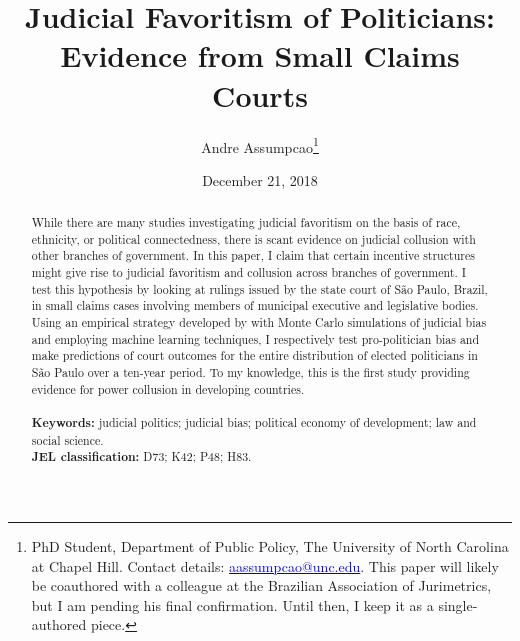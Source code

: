 \documentclass[11pt]{article}
\begin{document}
\begin{titlepage}
\title{Judicial Favoritism of Politicians: Evidence from Small Claims Courts}
\author{Andre Assumpcao\thanks{PhD Student, Department of Public Policy, The University of North Carolina at Chapel Hill. Contact details: \href{mailto:aassumpcao@unc.edu}{\textcolor{blue}{aassumpcao@unc.edu}}. This paper will likely be coauthored with a colleague at the Brazilian Association of Jurimetrics, but I am pending his final confirmation. Until then, I keep it as a single-authored piece.}}
\date{December 21, 2018}

\maketitle

\begin{abstract}
\noindent While there are many studies investigating judicial favoritism on the basis of race, ethnicity, or political connectedness, there is scant evidence on judicial collusion with other branches of government. In this paper, I claim that certain incentive structures might give rise to judicial favoritism and collusion across branches of government. I test this hypothesis by looking at rulings issued by the state court of São Paulo, Brazil, in small claims cases involving members of municipal executive and legislative bodies. Using an empirical strategy developed by \citet{AbramsJudgesVaryTheir2012} with Monte Carlo simulations of judicial bias and employing machine learning techniques, I respectively test pro-politician bias and make predictions of court outcomes for the entire distribution of elected politicians in São Paulo over a ten-year period. To my knowledge, this is the first study providing evidence for power collusion in developing countries. \\
\vspace{0in} \\
\noindent\textbf{Keywords:} judicial politics; judicial bias; political economy of development; law and social science. \\

\noindent\textbf{JEL classification:} D73; K42; P48; H83. \\

\vspace{0in}
\bigskip

\end{abstract}

\setcounter{page}{0}

\thispagestyle{empty}

\end{titlepage}
\end{document}
